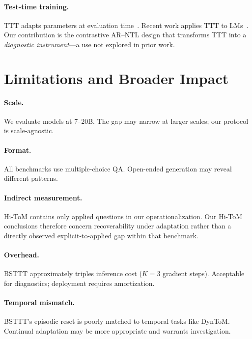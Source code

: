 \paragraph{Test-time training.}
TTT adapts parameters at evaluation time~\citep{Sun2019TestTimeTW, NEURIPS2021_b618c321}.
Recent work applies TTT to LMs~\citep{feng2026inplace}.
Our contribution is the contrastive AR--NTL design that transforms TTT into a \emph{diagnostic instrument}---a use not explored in prior work.


\section{Limitations and Broader Impact}
\label{sec:limitations}

\paragraph{Scale.} We evaluate models at 7--20B.
The gap may narrow at larger scales; our protocol is scale-agnostic.

\paragraph{Format.} All benchmarks use multiple-choice QA.
Open-ended generation may reveal different patterns.

\paragraph{Indirect measurement.} Hi-ToM contains only applied questions in our operationalization.
Our Hi-ToM conclusions therefore concern recoverability under adaptation rather than a directly observed explicit-to-applied gap within that benchmark.

\paragraph{Overhead.} BSTTT approximately triples inference cost ($K{=}3$ gradient steps).
Acceptable for diagnostics; deployment requires amortization.

\paragraph{Temporal mismatch.} BSTTT's episodic reset is poorly matched to temporal tasks like DynToM.
Continual adaptation may be more appropriate and warrants investigation.

